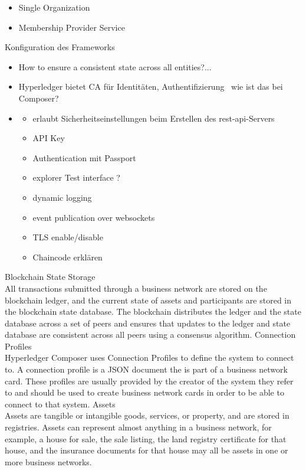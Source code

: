         \begin{itemize}[noitemsep]
            \item Single Organization 
            \item Membership Provider Service
        \end{itemize}
        
        Konfiguration des Frameworks
        \begin{itemize}[noitemsep]
            \item How to ensure a consistent state across all entities?...
            \item Hyperledger bietet CA für Identitäten, Authentifizierung \textrightarrow\ wie ist das bei Composer?
            \item \begin{itemize}
                \item erlaubt Sicherheitseinstellungen beim Erstellen des \gls{rest}-\gls{api}-Servers
                \item API Key
                \item Authentication mit Passport
                \item explorer Test interface ?
                \item dynamic logging
                \item event publication over websockets
                \item TLS enable/\-disable
                \item Chaincode erklären
            \end{itemize}
        \end{itemize}
    
Blockchain State Storage\\
All transactions submitted through a business network are stored on the blockchain ledger, and the current state of assets and participants are stored in the blockchain state database. The blockchain distributes the ledger and the state database across a set of peers and ensures that updates to the ledger and state database are consistent across all peers using a consensus algorithm.
\medskip
Connection Profiles\\
Hyperledger Composer uses Connection Profiles to define the system to connect to. A connection profile is a JSON document the is part of a business network card. These profiles are usually provided by the creator of the system they refer to and should be used to create business network cards in order to be able to connect to that system.
\medskip
Assets\\
Assets are tangible or intangible goods, services, or property, and are stored in registries. Assets can represent almost anything in a business network, for example, a house for sale, the sale listing, the land registry certificate for that house, and the insurance documents for that house may all be assets in one or more business networks.

